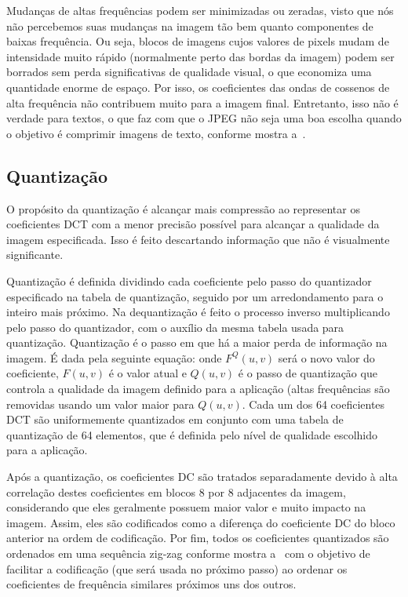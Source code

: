 
Mudanças de altas frequências podem ser minimizadas ou zeradas, visto que nós não percebemos suas mudanças na imagem tão bem quanto componentes de baixas frequência. Ou seja, blocos de imagens cujos valores de pixels mudam de intensidade muito rápido (normalmente perto das bordas da imagem) podem ser borrados sem perda significativas de qualidade visual, o que economiza uma quantidade enorme de espaço. Por isso, os coeficientes das ondas de cossenos de alta frequência não contribuem muito para a imagem final. Entretanto, isso não é verdade para textos, o que faz com que o JPEG não seja uma boa escolha quando o objetivo é comprimir imagens de texto, conforme mostra a~.
\subsection{Quantização}
O propósito da quantização é alcançar mais compressão ao representar os coeficientes \acrshort{DCT} com a menor precisão possível para alcançar a qualidade da imagem especificada. Isso é feito descartando informação que não é visualmente significante.

Quantização é definida dividindo cada coeficiente pelo passo do quantizador especificado na tabela de quantização, seguido por um arredondamento para o inteiro mais próximo. Na dequantização é feito o processo inverso multiplicando pelo passo do quantizador, com o auxílio da mesma tabela usada para quantização. Quantização é o passo em que há a maior perda de informação na imagem. É dada pela seguinte equação:
onde $F^Q(u,v)$ será o novo valor do coeficiente, $F(u,v)$  é o valor atual e $Q(u,v)$ é o passo de quantização que controla a qualidade da imagem definido para a aplicação (altas frequências são removidas usando um valor maior para $Q(u,v)$. Cada um dos 64 coeficientes \acrshort{DCT} são uniformemente quantizados em conjunto com uma tabela de quantização de 64 elementos, que é definida pelo nível de qualidade escolhido para a aplicação.

Após a quantização, os coeficientes \acrshort{DC} são tratados separadamente devido à alta correlação destes coeficientes em blocos 8 por 8 adjacentes da imagem, considerando que eles geralmente possuem maior valor e muito impacto na imagem. Assim, eles são codificados como a diferença do coeficiente DC do bloco anterior na ordem de codificação. Por fim, todos os coeficientes quantizados são ordenados em uma sequência zig-zag conforme mostra a~ com o objetivo de facilitar a codificação (que será usada no próximo passo) ao ordenar os coeficientes de frequência similares próximos uns dos outros.

